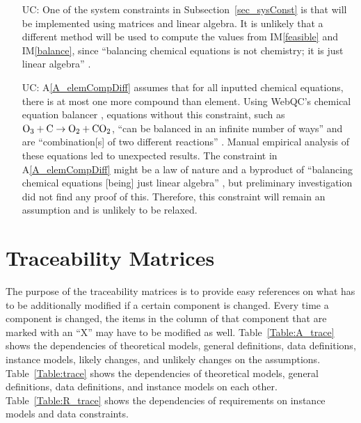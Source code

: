 \documentclass[12pt]{article}
\newcommand{\aref}[1]{A\ref{#1}}
\newcommand{\iref}[1]{IM\ref{#1}}
\newcounter{ucnum} %
\begin{document}
\begin{itemize}

  \item[UC\refstepcounter{ucnum}\theucnum\label{UC_diffSolveMethod}:] One of
    the system constraints in Subsection~\ref{sec_sysConst} is that \progname{}
    will be implemented using matrices and linear algebra. It is unlikely that
    a different method will be used to compute the values from \iref{feasible}
    and \iref{balance}, since ``balancing chemical equations is not chemistry;
    it is just linear algebra'' \cite[p. 193]{risteski_new_2021}.

  \item[UC\refstepcounter{ucnum}\theucnum\label{UC_allEqsPermitted}:]
    \aref{A_elemCompDiff} assumes that for all inputted chemical equations,
    there is at most one more compound than element. Using WebQC's chemical
    equation balancer \cite{noauthor_balance_2023}, equations without this
    constraint, such as $\ce{O3} + \ce{C} \rightarrow \ce{O2} + \ce{CO2}$,
    ``can be balanced in an infinite number of ways'' and are
    ``combination[s] of two different reactions'' \cite{noauthor_balance_2023}.
    Manual empirical analysis of these equations led to unexpected results.
    The constraint in \aref{A_elemCompDiff} might be a law of nature and a
    byproduct of ``balancing chemical equations [being] just linear algebra''
    \cite[p. 193]{risteski_new_2021}, but preliminary investigation did not
    find any proof of this. Therefore, this constraint will remain an
    assumption and is unlikely to be relaxed.

\end{itemize}

\section{Traceability Matrices} \label{sec_traceMats}

The purpose of the traceability matrices is to provide easy references on what
has to be additionally modified if a certain component is changed.  Every time a
component is changed, the items in the column of that component that are marked
with an ``X'' may have to be modified as well. Table~\ref{Table:A_trace} shows
the dependencies of theoretical models,
general definitions, data definitions, instance models, likely changes, and
unlikely changes on the assumptions. Table~\ref{Table:trace} shows the
dependencies of theoretical models, general definitions, data definitions, and
instance models on each other. Table~\ref{Table:R_trace} shows the
dependencies of requirements on instance models and data constraints.
\end{document}
